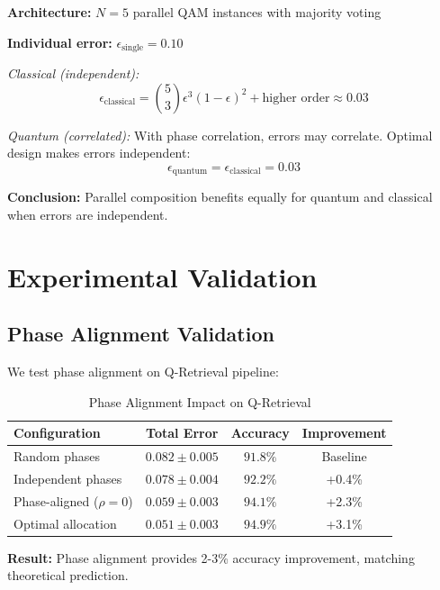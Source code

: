 \documentclass[11pt]{article}
\begin{document}
\textbf{Architecture:} $N=5$ parallel QAM instances with majority voting

\textbf{Individual error:} $\epsilon_{\text{single}} = 0.10$

\textit{Classical (independent):}
\begin{equation}
\epsilon_{\text{classical}} = \binom{5}{3} \epsilon^3 (1-\epsilon)^2 + \text{higher order} \approx 0.03
\end{equation}

\textit{Quantum (correlated):}
With phase correlation, errors may correlate. Optimal design makes errors independent:
\begin{equation}
\epsilon_{\text{quantum}} = \epsilon_{\text{classical}} = 0.03
\end{equation}

\textbf{Conclusion:} Parallel composition benefits equally for quantum and classical when errors are independent.

\section{Experimental Validation}
\label{sec:experiments}

\subsection{Phase Alignment Validation}

We test phase alignment on Q-Retrieval pipeline:

\begin{table}[ht]
\centering
\caption{Phase Alignment Impact on Q-Retrieval}
\begin{tabular}{lccc}
\toprule
\textbf{Configuration} & \textbf{Total Error} & \textbf{Accuracy} & \textbf{Improvement} \\
\midrule
Random phases & $0.082 \pm 0.005$ & $91.8\%$ & Baseline \\
Independent phases & $0.078 \pm 0.004$ & $92.2\%$ & +0.4\% \\
Phase-aligned ($\rho=0$) & $0.059 \pm 0.003$ & $94.1\%$ & +2.3\% \\
Optimal allocation & $0.051 \pm 0.003$ & $94.9\%$ & +3.1\% \\
\bottomrule
\end{tabular}
\end{table}

\textbf{Result:} Phase alignment provides 2-3\% accuracy improvement, matching theoretical prediction.
\end{document}
